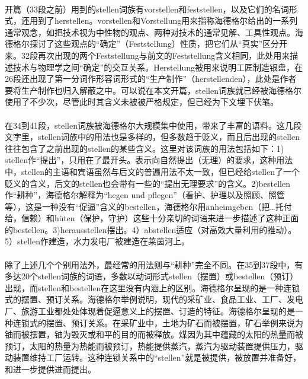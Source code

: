 \documentclass{article}
\begin{document}
			\paragraph{}
		开篇（33段之前）用到的stellen词族有vorstellen和feststellen，以及它们的名词形式，还用到了herstellen。vorstellen和Vorstellung用来指称海德格尔给出的一系列通常观念，如把技术视为中性物的观点、两种对技术的通常见解、工具性观点。海德格尔探讨了这些观点的“确定”（Feststellung）性质，把它们从“真实”区分开来。32段再次出现的两个Feststellung与前文的Feststellung含义相同，此处用来描述技术与物理学之间“确定”的交互关系。Herstellung被用来说明工匠制造银盘，在26段还出现了第一分词作形容词形式的“生产制作”（herstellenden），此处是作者要将生产制作也归入解蔽之中。可以说在本文开篇，stellen词族就已经被海德格尔使用了不少次，尽管此时其含义未被被严格规定，但已经为下文埋下伏笔。
			\paragraph{}
		在34到41段，stellen词族被海德格尔大规模集中使用，带来了丰富的语料。这几段文字里，stellen词族中的用法也是多样的，但多数趋于贬义，而且后出现的stellen往往包含了之前出现的stellen的某些含义。这里对该词族的用法包括如下：1) stellen作“提出”，只用在了最开头。表示向自然提出（无理）的要求，这种用法中，stellen的主语和宾语虽然与后文的普遍用法不太一致，但已经给stellen了一个贬义的含义，后文的stellen也会带有一些的“提出无理要求”的含义。2)bestellen作“耕种”，海德格尔解释为“hegen und pflegen”（看护、护理以及照顾、照管等），这是一种没有“促逼”含义的bestellen，海德格尔用anheimgeben（把…托付给，信赖）和hüten（保护，守护）这些十分亲切的词语来进一步描述了这种正面的bestellen。3)herausstellen摆出。4）abstellen适应（对高效大量利用的推动）。5）stellen作建造，水力发电厂被建造在莱茵河上。
			\paragraph{}
		除了上述几个个别用法外，最经常的用法则与“耕种”完全不同。在35到37段中，有多达20个stellen词族的词语，多数以动词形式stellen（摆置）或bestellen（预订）出现，而stellen和bestellen在这里没有内涵上的区别。海德格尔呈现的是一种连锁式的摆置、预订关系。海德格尔举例说明，现代的采矿业、食品工业、工厂、发电厂、旅游工业都处处体现着促逼意义上的摆置、订造的特征。海德格尔呈现的是一种连锁式的摆置、预订关系。在采矿业中，土地为矿石而被摆置，矿石举例来说为铀而被摆置，铀为毁灭或和平的目的而被释放。煤因为其中蕴藏的太阳的热量而被预订，太阳的热量为热能而被预订，热能提供蒸汽，蒸汽为驱动装置提供压力，驱动装置维持工厂运转。这种连锁关系中的“stellen”就是被提供，被放置并准备好，和进一步提供进而提出。
\end{document}
